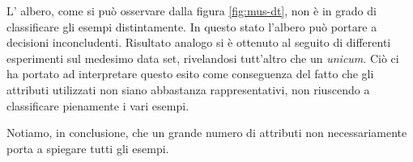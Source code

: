 					
			L' albero, come si può osservare dalla figura \vref{fig:mus-dt}, non è in grado di classificare gli esempi distintamente. In questo stato l'albero può portare a decisioni inconcludenti. Risultato analogo si è ottenuto al seguito di differenti esperimenti sul medesimo data set, rivelandosi tutt'altro che un \textit{unicum}. Ciò ci ha portato ad interpretare questo esito come conseguenza del fatto che gli attributi utilizzati non siano abbastanza rappresentativi, non riuscendo a classificare pienamente i vari esempi.
			
		    
			Notiamo, in conclusione, che un grande numero di attributi non necessariamente porta a spiegare tutti gli esempi.
		\newpage
